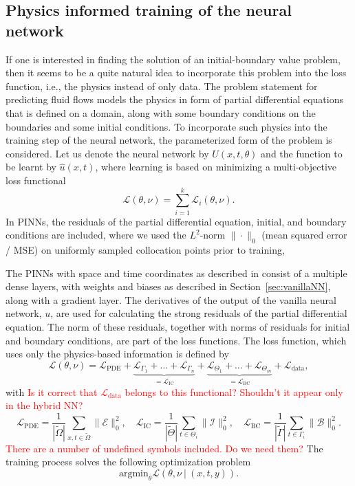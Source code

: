 \subsection{Physics informed training of the neural network}
\label{sec:pinns}

If one is interested in finding the solution of an initial-boundary value problem, then it seems to be 
a quite natural idea to incorporate this problem into the loss function, i.e., the physics instead of only data. The problem statement for predicting fluid flows models the physics in 
form of partial differential equations that is defined on a domain, along with some boundary conditions on the boundaries and some initial conditions. To incorporate such physics into the training step of the neural network, the  parameterized form of the problem is considered. Let us denote the neural network by   
$U(x, t, \theta )$ and the function to be learnt by $\hat{u}(x,t)$, where learning is based on minimizing  a multi-objective loss functional
\[
\mathcal{L} (\theta, \nu)  = \sum_{i=1}^k \mathcal{L}_i ( \theta , \nu).
\]
In PINNs,  the residuals of the partial differential equation, initial, and boundary conditions are included, 
where we used the $L^2$-norm $\|\cdot\|_0$  (mean squared error / MSE) on uniformly sampled collocation points prior to training,    

The PINNs with space and time coordinates as described in \cite{??} consist of a multiple dense layers, with weights and biases as described in Section~\ref{sec:vanillaNN}, along with a gradient layer. The derivatives of the output of the vanilla neural network, $u$, are used for calculating the strong residuals of the 
partial differential equation. The norm of these residuals, together with norms of residuals for 
initial and boundary conditions, are part of the loss functions. The loss function, which uses only
the physics-based information is defined  by 
\begin{equation}\label{eq:fct_phys}
\mathcal{L}(\theta, \nu ) = \mathcal{L}_{\mathrm{PDE}}  + \underbrace{\mathcal{L}_{\Gamma_1} + \ldots  + \mathcal{L}_{\Gamma_n}}_{= \mathcal{L}_{\mathrm{IC}}}  + \underbrace{\mathcal{L}_{\Theta_1} +\ldots + \mathcal{L}_{\Theta_m}}_{= \mathcal{L}_{\mathrm{BC}} } +  \mathcal{L}_{\mathrm{data}},
\end{equation}
with \textcolor{red}{Is it correct that $\mathcal{L}_{\mathrm{data}}$ belongs 
to this functional? Shouldn't it appear only in the hybrid NN?}
\[
\mathcal{L}_{\mathrm{PDE}} = \frac{1}{|\tilde{\Omega}|} \sum_{x,t \in \tilde{\Omega}} \| \mathcal{E}\|^2_0, \quad
\mathcal{L}_{\mathrm{IC}} = \frac{1}{|\tilde{\Theta}|} \sum_{t \in \Theta_i} \| \mathcal{I}\|^2_0, \quad  
\mathcal{L}_{\mathrm{BC}}  = \frac{1}{|\tilde{\Gamma}|} \sum_{t \in \Gamma_i} \| \mathcal{B}\|^2_0.
\]
\textcolor{red}{There are a number of undefined symbols included. Do we need them?}
The training process solves the following optimization problem 
\[
\mbox{argmin}_\theta \mathcal{L} (\theta, \nu \ | \ (x,t ,y)).
\]

